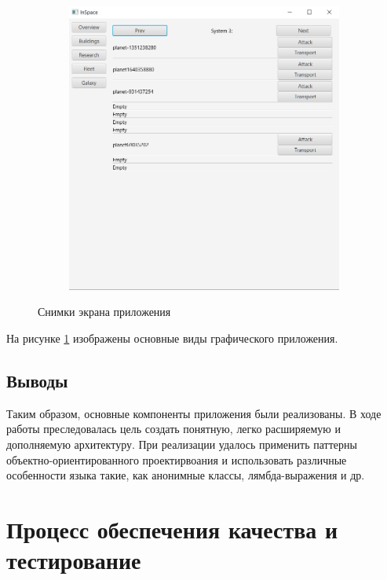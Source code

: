 \begin{figure}[H]
\begin{subfigure}[b]{0.28\textwidth}
\end{subfigure}
\begin{subfigure}[b]{0.28\textwidth} 
\includegraphics[width=1\textwidth]{../screenshots/5.png}
\end{subfigure}
\label{pic:gui}
\caption{Снимки экрана приложения}
\end{figure} 

На рисунке \ref{pic:gui} изображены основные виды графического приложения.   

\subsection{Выводы}
Таким образом, основные компоненты приложения были реализованы. В ходе работы преследовалась цель создать понятную, легко расширяемую и дополняемую архитектуру. При реализации удалось применить паттерны объектно-ориентированного проектирвоания и использовать различные особенности языка такие, как анонимные классы, лямбда-выражения и др. 
   
\section{Процесс обеспечения качества и тестирование}

